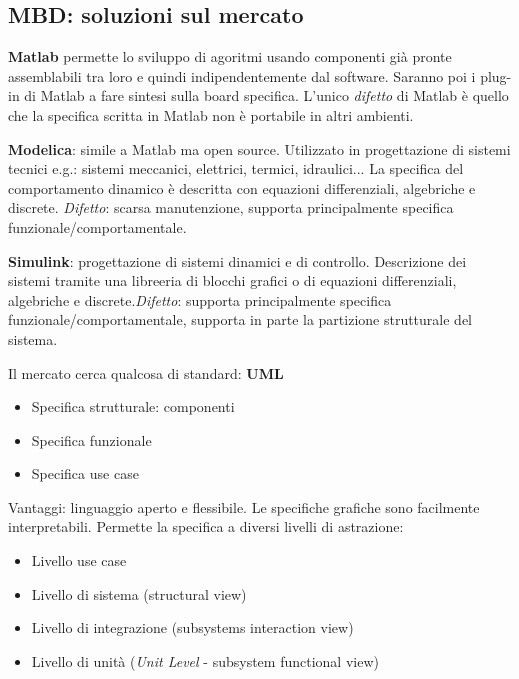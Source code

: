 \documentclass[a4paper]{article}
\theoremstyle{definition}
\begin{document}
		\subsection{MBD: soluzioni sul mercato}
		
			\textbf{Matlab} permette lo sviluppo di agoritmi usando componenti già pronte assemblabili tra loro e quindi indipendentemente dal software. Saranno poi i plug-in di Matlab a fare sintesi sulla board specifica. L'unico \textit{difetto} di Matlab è quello che la specifica scritta in Matlab non è portabile in altri ambienti.
			
			\noindent
			\textbf{Modelica}: simile a Matlab ma open source. Utilizzato in progettazione di sistemi tecnici e.g.: sistemi meccanici, elettrici, termici, idraulici... La specifica del comportamento dinamico è descritta con equazioni differenziali, algebriche e discrete. \textit{Difetto}: scarsa manutenzione, supporta principalmente specifica funzionale/comportamentale.
			
			\noindent
			\textbf{Simulink}: progettazione di sistemi dinamici e di controllo. Descrizione dei sistemi tramite una libreeria di blocchi grafici o di equazioni differenziali, algebriche e discrete.\textit{Difetto}: supporta principalmente specifica funzionale/comportamentale, supporta in parte la partizione strutturale del sistema.
		
			Il mercato cerca qualcosa di standard: \textbf{UML}
			\begin{itemize}
				\item Specifica strutturale: componenti
				\item Specifica funzionale
				\item Specifica use case
			\end{itemize}
			Vantaggi: linguaggio aperto e flessibile. Le specifiche grafiche sono facilmente interpretabili. Permette la specifica a diversi livelli di astrazione:
			\begin{itemize}
				\item Livello use case
				\item Livello di sistema (structural view)
				\item Livello di integrazione (subsystems interaction view)
				\item Livello di unità (\textit{Unit Level} - subsystem functional view)
			\end{itemize} 
		
\end{document}
